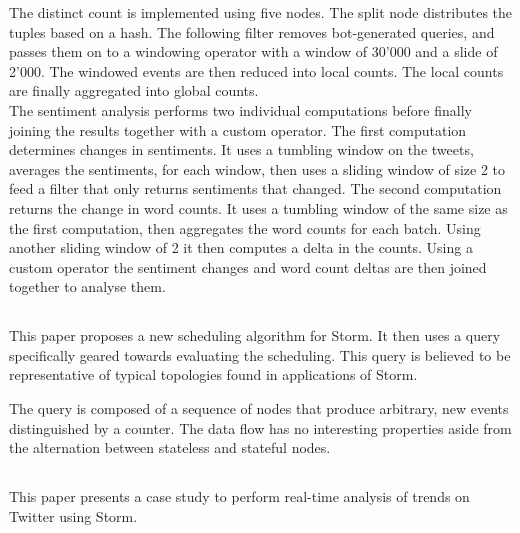 The distinct count is implemented using five nodes. The split node distributes the tuples based on a hash. The following filter removes bot-generated queries, and passes them on to a windowing operator with a window of 30'000 and a slide of 2'000. The windowed events are then reduced into local counts. The local counts are finally aggregated into global counts. \\

The sentiment analysis performs two individual computations before finally joining the results together with a custom operator. The first computation determines changes in sentiments. It uses a tumbling window on the tweets, averages the sentiments, for each window, then uses a sliding window of size 2 to feed a filter that only returns sentiments that changed. The second computation returns the change in word counts. It uses a tumbling window of the same size as the first computation, then aggregates the word counts for each batch. Using another sliding window of 2 it then computes a delta in the counts. Using a custom operator the sentiment changes and word count deltas are then joined together to analyse them.

\subsection{}
This paper proposes a new scheduling algorithm for Storm. It then uses a query specifically geared towards evaluating the scheduling. This query is believed to be representative of typical topologies found in applications of Storm.\\


The query is composed of a sequence of nodes that produce arbitrary, new events distinguished by a counter. The data flow has no interesting properties aside from the alternation between stateless and stateful nodes.

\subsection{}
This paper presents a case study to perform real-time analysis of trends on Twitter using Storm. \\


